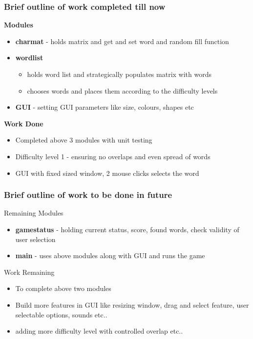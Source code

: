 \documentclass{beamer}
\begin{document}
\begin{frame}\frametitle {Brief outline of work completed till now}
\textbf{Modules}
\begin{itemize} 
\item \textbf{charmat} - holds matrix and get and set word and random fill function
\item \textbf{wordlist}
\begin{itemize} \item holds word list and strategically populates matrix with words  \item  chooses words and places them according to the difficulty levels \end{itemize}
\item \textbf{GUI} - setting GUI parameters like size, colours, shapes etc
\end{itemize}
\textbf{Work Done}
\begin{itemize}
\item Completed above 3 modules with unit testing
\item Difficulty level 1 - ensuring no overlaps and even spread of words
\item GUI with fixed sized window, 2 mouse clicks selects the word  
 \end{itemize}
\end{frame}

\begin{frame}
\frametitle{Brief outline of work to be done in future}
Remaining Modules 
\begin{itemize}
\item \textbf{gamestatus} - holding current status, score, found words,  check validity of user selection
\item \textbf{main} - uses above modules along with GUI and runs the game
\end{itemize}
Work Remaining
\begin{itemize}

\item To complete above two modules
\item Build more features in GUI like resizing window, drag and select feature, user selectable options, sounds etc..
\item adding more difficulty level with controlled overlap etc..

\end{itemize}

\end{frame}
\end{document}

